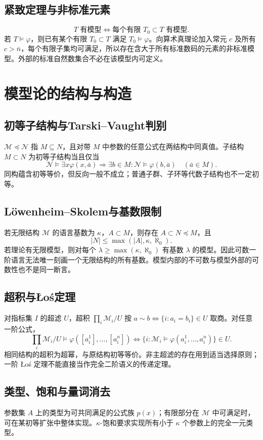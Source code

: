 \documentclass[../main.tex]{subfiles}
\begin{document}
\subsection{紧致定理与非标准元素}
\[
T\text{ 有模型}\iff\text{每个有限 }T_0\subset T\text{ 有模型}.
\]
若 $T\models\varphi$，则已有某个有限 $T_0\subset T$ 满足 $T_0\models\varphi$。向算术真理论加入常元 $c$ 及所有 $c>\bar n$，每个有限子集均可满足，所以存在含大于所有标准数码的元素的非标准模型。外部的标准自然数集合不必在该模型内可定义。
\section{模型论的结构与构造}
\subsection{初等子结构与Tarski--Vaught判别}
$\mathcal M\preccurlyeq\mathcal N$ 指 $M\subseteq N$，且对带 $M$ 中参数的任意公式在两结构中同真值。子结构 $M\subset N$ 为初等子结构当且仅当
\[
\mathcal N\models\exists x\varphi(x,\bar a)\Rightarrow
\exists b\in M:\mathcal N\models\varphi(b,\bar a)\quad(\bar a\in M).
\]
同构蕴含初等等价，但反向一般不成立；普通子群、子环等代数子结构也不一定初等。
\subsection{Löwenheim--Skolem与基数限制}
若无限结构 $\mathcal M$ 的语言基数为 $\kappa$，$A\subset M$，则存在 $A\subset N\preccurlyeq M$，且
\[
|N|\le\max(|A|,\kappa,\aleph_0).
\]
若理论有无限模型，则对每个 $\lambda\ge\max(\kappa,\aleph_0)$ 有基数 $\lambda$ 的模型。因此可数一阶语言无法唯一刻画一个无限结构的所有基数。模型内部的不可数与模型外部的可数性也不是同一断言。
\subsection{超积与Łoś定理}
对指标集 $I$ 的超滤 $U$，超积 $\prod_i\mathcal M_i/U$ 按 $a\sim b\iff\{i:a_i=b_i\}\in U$ 取商。对任意一阶公式，
\[
\prod_i\mathcal M_i/U\models\varphi([a_i^1],\ldots,[a_i^n])
\iff\{i:\mathcal M_i\models\varphi(a_i^1,\ldots,a_i^n)\}\in U.
\]
相同结构的超积为超幂，与原结构初等等价。非主超滤的存在用到适当选择原则；一阶 Łoś 定理不能直接当作完全二阶语义的传递定理。
\subsection{类型、饱和与量词消去}
参数集 $A$ 上的类型为可共同满足的公式族 $p(x)$；有限部分在 $\mathcal M$ 中可满足时，可在某初等扩张中整体实现。$\kappa$-饱和要求实现所有小于 $\kappa$ 个参数上的完全一元类型。
\end{document}
